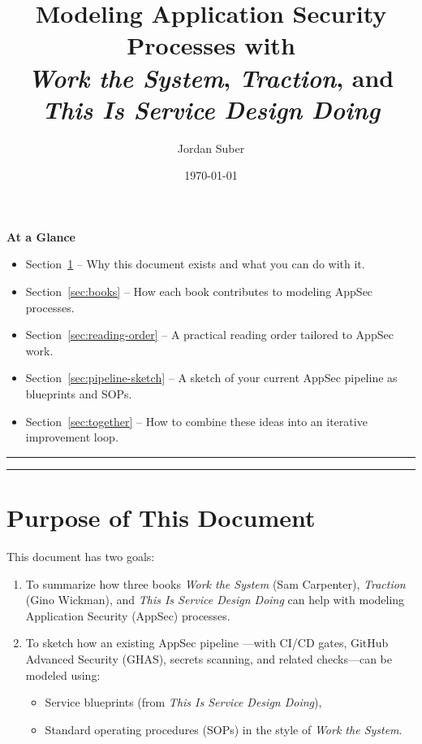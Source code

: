 \documentclass[11pt]{article}
\title{Modeling Application Security Processes with\\
\emph{Work the System}, \emph{Traction}, and \emph{This Is Service Design Doing}}
\author{Jordan Suber}
\date{\today}
\begin{document}
\maketitle

\begin{center}
\textbf{At a Glance}
\end{center}

\begin{itemize}
  \item Section~\ref{sec:purpose} -- Why this document exists and what you can do with it.
  \item Section~\ref{sec:books} -- How each book contributes to modeling AppSec processes.
  \item Section~\ref{sec:reading-order} -- A practical reading order tailored to AppSec work.
  \item Section~\ref{sec:pipeline-sketch} -- A sketch of your current AppSec pipeline as blueprints and SOPs.
  \item Section~\ref{sec:together} -- How to combine these ideas into an iterative improvement loop.
\end{itemize}

\bigskip
\hrule
\tableofcontents
\bigskip
\hrule

\section{Purpose of This Document}
\label{sec:purpose}

This document has two goals:

\begin{enumerate}
  \item To summarize how three books
  \emph{Work the System} (Sam Carpenter),
  \emph{Traction} (Gino Wickman), and
  \emph{This Is Service Design Doing}
  can help with modeling Application Security (AppSec) processes.
  \item To sketch how an existing AppSec pipeline
  ---with CI/CD gates, GitHub Advanced Security (GHAS), secrets scanning,
  and related checks---can be modeled using:
  \begin{itemize}
    \item Service blueprints (from \emph{This Is Service Design Doing}),
    \item Standard operating procedures (SOPs) in the style of
          \emph{Work the System}.
  \end{itemize}
\end{enumerate}
\end{document}
